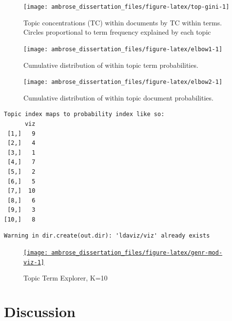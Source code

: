\documentclass[]{book}
\theoremstyle{definition}
\theoremstyle{definition}
\theoremstyle{definition}
\theoremstyle{remark}
\begin{document}
\begin{figure}

{\centering \texttt{[image: ambrose\_dissertation\_files/figure-latex/top-gini-1]} 

}

\caption{Topic concentrations (TC) within documents by TC within terms. Circles proportional to term frequency explained by each topic}\label{fig:top-gini}
\end{figure}

\begin{figure}

{\centering \texttt{[image: ambrose\_dissertation\_files/figure-latex/elbow1-1]} 

}

\caption{Cumulative distribution of within topic term probabilities.}\label{fig:elbow1}
\end{figure}

\begin{figure}

{\centering \texttt{[image: ambrose\_dissertation\_files/figure-latex/elbow2-1]} 

}

\caption{Cumulative distribution of within topic document probabilities.}\label{fig:elbow2}
\end{figure}

\begin{verbatim}
Topic index maps to probability index like so:
      viz
 [1,]   9
 [2,]   4
 [3,]   1
 [4,]   7
 [5,]   2
 [6,]   5
 [7,]  10
 [8,]   6
 [9,]   3
[10,]   8
\end{verbatim}

\begin{verbatim}
Warning in dir.create(out.dir): 'ldaviz/viz' already exists
\end{verbatim}

\begin{figure}

{\centering \href{https://mercury.dlab.berkeley.edu:2018}{\texttt{[image: ambrose\_dissertation\_files/figure-latex/genr-mod-viz-1]} }

}

\caption{Topic Term Explorer, K=10}\label{fig:genr-mod-viz}
\end{figure}

\hypertarget{discussion}{%
\section{Discussion}\label{discussion}}


\end{document}

